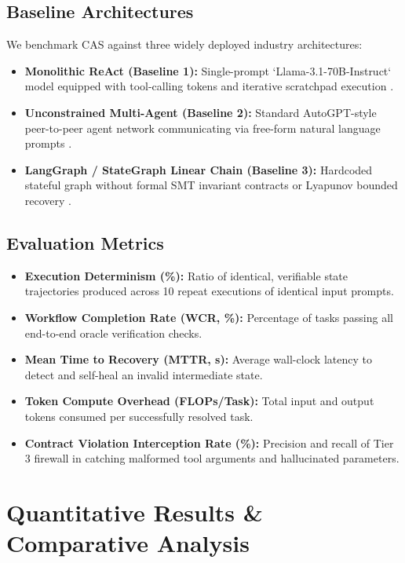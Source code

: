 \documentclass[10pt,twocolumn,letterpaper]{article}
\begin{document}
\subsection{Baseline Architectures}


We benchmark CAS against three widely deployed industry architectures:
\begin{itemize}
  \item \textbf{Monolithic ReAct (Baseline 1):} Single-prompt `Llama-3.1-70B-Instruct` model equipped with tool-calling tokens and iterative scratchpad execution \cite{arxiv_2203_02155}.
  \item \textbf{Unconstrained Multi-Agent (Baseline 2):} Standard AutoGPT-style peer-to-peer agent network communicating via free-form natural language prompts \cite{arxiv_2412_06333}.
  \item \textbf{LangGraph / StateGraph Linear Chain (Baseline 3):} Hardcoded stateful graph without formal SMT invariant contracts or Lyapunov bounded recovery \cite{arxiv_2404_01131}.
\end{itemize}


\subsection{Evaluation Metrics}


\begin{itemize}
  \item \textbf{Execution Determinism (\%):} Ratio of identical, verifiable state trajectories produced across 10 repeat executions of identical input prompts.
  \item \textbf{Workflow Completion Rate (WCR, \%):} Percentage of tasks passing all end-to-end oracle verification checks.
  \item \textbf{Mean Time to Recovery (MTTR, s):} Average wall-clock latency to detect and self-heal an invalid intermediate state.
  \item \textbf{Token Compute Overhead (FLOPs/Task):} Total input and output tokens consumed per successfully resolved task.
  \item \textbf{Contract Violation Interception Rate (\%):} Precision and recall of Tier 3 firewall in catching malformed tool arguments and hallucinated parameters.
\end{itemize}




\section{Quantitative Results \& Comparative Analysis}
\end{document}
